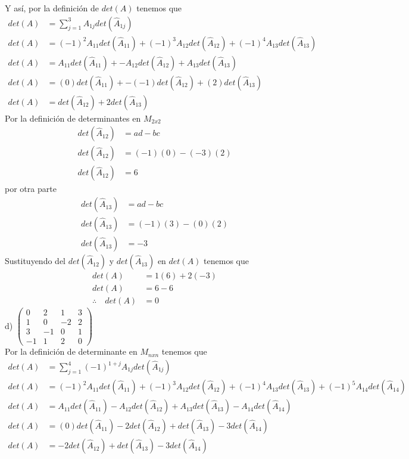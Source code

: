 \documentclass[letterpaper]{article}
\renewcommand{\*}{\cdot}
\theoremstyle{definition}
\begin{document}
	Y así, por la definición de $ det(A) $ tenemos que 
	\begin{align*}
		det(A) &= \sum_{j = 1}^{3} A_{1j} det(\hat{A}_{1j}) \\
		det(A) &= (-1)^2 A_{11} det(\hat{A}_{11}) + (-1)^3 A_{12} det(\hat{A}_{12}) + (-1)^4 A_{13} det(\hat{A}_{13}) \\
		det(A) &= A_{11} det(\hat{A}_{11}) + -A_{12} det(\hat{A}_{12}) + A_{13} det(\hat{A}_{13}) \\
		det(A) &= (0)det(\hat{A}_{11}) + -(-1) det(\hat{A}_{12}) + (2) det(\hat{A}_{13}) \\
		det(A) &= det(\hat{A}_{12}) + 2det(\hat{A}_{13}) 
	\end{align*}
	Por la definición de determinantes en $ M_{2x2} $
	\begin{align*}
		det(\hat{A}_{12}) &= ad -bc\\
		det(\hat{A}_{12}) &= (-1)(0)-(-3)(2)\\
		det(\hat{A}_{12}) &= 6
	\end{align*}
	por otra parte
	\begin{align*}
		det(\hat{A}_{13}) &= ad -bc \\
		det(\hat{A}_{13}) &= (-1)(3) - (0)(2) \\
		det(\hat{A}_{13}) &= -3 
	\end{align*}
	Sustituyendo del $ det(\hat{A}_{12}) $ y $ det(\hat{A}_{13}) $ en $ det(A) $ tenemos que 
	\begin{align*}
		det(A) &= 1(6) +2(-3)\\
		det(A) &= 6 -6\\
		\therefore \quad det(A) &= 0
	\end{align*}
	d) $\begin{pmatrix} 0 & 2 & 1 & 3 \\ 1 & 0 & -2 & 2 \\ 3 & -1 & 0 & 1 \\ -1 & 1 & 2 & 0 \end{pmatrix}$\\
	Por la definición de determinante en $ M_{nxn} $ tenemos que 
	\begin{align*}
		det(A) &= \sum_{j = 1}^{4} (-1)^{1+j} A_{1j} det(\hat{A}_{1j})\\
		det(A) &= (-1)^{2} A_{11} det(\hat{A}_{11}) + (-1)^{3} A_{12} det(\hat{A}_{12}) + (-1)^{4} A_{13} det(\hat{A}_{13}) + (-1)^{5} A_{14} det(\hat{A}_{14})\\
		det(A) &= A_{11} det(\hat{A}_{11}) -A_{12} det(\hat{A}_{12}) +A_{13} det(\hat{A}_{13}) -A_{14} det(\hat{A}_{14})\\
		det(A) &= (0)det(\hat{A}_{11}) -2det(\hat{A}_{12}) +det(\hat{A}_{13}) -3det(\hat{A}_{14})\\
		det(A) &= -2det(\hat{A}_{12}) +det(\hat{A}_{13}) -3det(\hat{A}_{14})\\
	\end{align*}
\end{document}
